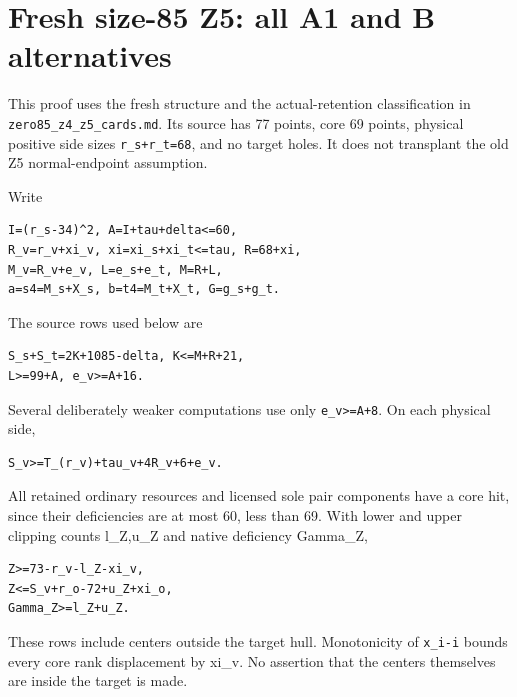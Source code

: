 \documentclass[10pt,a4paper]{article}
\theoremstyle{definition}
\begin{document}
\clearpage
\hypertarget{fresh-size-85-z5-all-a1-and-b-alternatives}{%
\section{Fresh size-85 Z5: all A1 and B
alternatives}\label{fresh-size-85-z5-all-a1-and-b-alternatives}}

This proof uses the fresh structure and the actual-retention
classification in \texttt{zero85\_\allowbreak{}\allowbreak{}z4\_\allowbreak{}\allowbreak{}z5\_\allowbreak{}\allowbreak{}cards.md}.
Its source has 77 points,\allowbreak{} core 69 points,\allowbreak{} physical positive side sizes
\texttt{r\_\allowbreak{}\allowbreak{}s+\allowbreak{}r\_\allowbreak{}\allowbreak{}t=\allowbreak{}68},\allowbreak{} and no target holes. It does not
transplant the old Z5 normal-endpoint assumption.

Write

\begin{lstlisting}
I=(r_s-34)^2, A=I+tau+delta<=60,
R_v=r_v+xi_v, xi=xi_s+xi_t<=tau, R=68+xi,
M_v=R_v+e_v, L=e_s+e_t, M=R+L,
a=s4=M_s+X_s, b=t4=M_t+X_t, G=g_s+g_t.
\end{lstlisting}

The source rows used below are

\begin{lstlisting}
S_s+S_t=2K+1085-delta, K<=M+R+21,
L>=99+A, e_v>=A+16.
\end{lstlisting}

Several deliberately weaker computations use only
\texttt{e\_\allowbreak{}\allowbreak{}v>=\allowbreak{}A+\allowbreak{}8}. On each physical side,\allowbreak{}

\begin{lstlisting}
S_v>=T_(r_v)+tau_v+4R_v+6+e_v.
\end{lstlisting}

All retained ordinary resources and licensed sole pair components have a
core hit,\allowbreak{} since their deficiencies are at most 60,\allowbreak{} less than 69. With
lower and upper clipping counts l\_\allowbreak{}Z,\allowbreak{}u\_\allowbreak{}Z and native deficiency
Gamma\_\allowbreak{}Z,\allowbreak{}

\begin{lstlisting}
Z>=73-r_v-l_Z-xi_v,
Z<=S_v+r_o-72+u_Z+xi_o,
Gamma_Z>=l_Z+u_Z.
\end{lstlisting}

These rows include centers outside the target hull. Monotonicity of
\texttt{x\_\allowbreak{}\allowbreak{}i-i} bounds every core rank displacement by
xi\_\allowbreak{}v. No assertion that the centers themselves are inside the target is
made.
\end{document}
